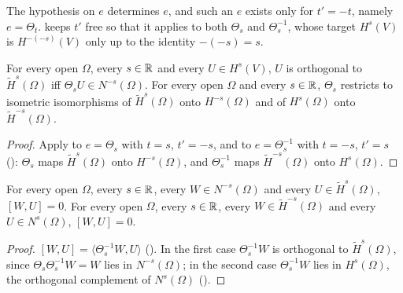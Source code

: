The hypothesis on $e$ determines $e$, and such an $e$ exists only for $t' = -t$, namely
$e = \Theta_t$.  keeps $t'$ free so that it applies to both
$\Theta_s$ and $\Theta_s^{-1}$, whose target $H^s(V)$ is $H^{-(-s)}(V)$ only up to the identity
$-(-s) = s$.

\begin{theorem}
\label{thm:tilde-restriction-shift}
\leanok
{}
For every open $\Omega$, every $s \in \mathbb{R}$ and every $U \in H^s(V)$, $U$ is orthogonal to
$\tilde H^s(\Omega)$ iff $\Theta_s U \in N^{-s}(\Omega)$. For every open $\Omega$ and every
$s \in \mathbb{R}$, $\Theta_s$ restricts to isometric isomorphisms of $\tilde H^s(\Omega)$ onto
$H^{-s}(\Omega)$ and of $H^s(\Omega)$ onto $\tilde H^{-s}(\Omega)$.
\end{theorem}

\begin{proof}
\leanok
Apply  to $e = \Theta_s$ with $t = s$, $t' = -s$, and to
$e = \Theta_s^{-1}$ with $t = -s$, $t' = s$ (): $\Theta_s$ maps
$\tilde H^s(\Omega)$ onto $H^{-s}(\Omega)$, and $\Theta_s^{-1}$ maps $\tilde H^{-s}(\Omega)$ onto
$H^s(\Omega)$.
\end{proof}

\begin{lemma}
\label{lem:sobolev-pairing-vanishing}
\leanok
{}
For every open $\Omega$, every $s \in \mathbb{R}$, every $W \in N^{-s}(\Omega)$ and every
$U \in \tilde H^s(\Omega)$, $[W, U] = 0$. For every open $\Omega$, every $s \in \mathbb{R}$, every
$W \in \tilde H^{-s}(\Omega)$ and every $U \in N^s(\Omega)$, $[W, U] = 0$.
\end{lemma}

\begin{proof}
\leanok
$[W, U] = \langle \Theta_s^{-1} W, U \rangle$ (). In the first case
$\Theta_s^{-1} W$ is orthogonal to $\tilde H^s(\Omega)$, since $\Theta_s \Theta_s^{-1} W = W$ lies
in $N^{-s}(\Omega)$; in the second case $\Theta_s^{-1} W$ lies in $H^s(\Omega)$, the orthogonal
complement of $N^s(\Omega)$ ().
\end{proof}

